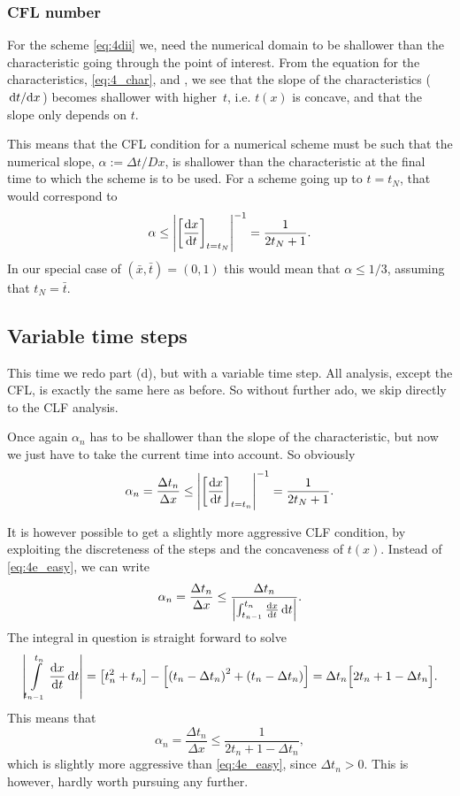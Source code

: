 \documentclass[11pt,letter, swedish, english
]{article}
\newcommand{\Dx}{\ensuremath{\Delta{x}}}
\newcommand{\Dt}{\ensuremath{\Delta{t}}}
\begin{document}
\subsubsection{CFL number}
For the scheme \eqref{eq:4dii} we, need the numerical domain to be
shallower than the characteristic going through the point of
interest. From the equation for the characteristics,
\eqref{eq:4_char}, and , we see that the slope of the
characteristics ($\dv*{t}{x}$) becomes shallower with higher~$t$, i.e.
$t(x)$ is concave, and that the slope only depends on $t$. 

This means that the CFL condition for a numerical scheme must be such
that the numerical slope, $\alpha := \Dt/Dx$, is shallower than the
characteristic at the final time to which the scheme is to be used. 
For a scheme going up to $t=t_N$, that would correspond to
\begin{equation}
\alpha \le \qty|\qty[\dv{x}{t}]_{t=t_N}|^{-1}
= \frac{1}{2t_N +1}.
\end{equation}
In our special case of $(\bar{x}, \bar{t}) = (0, 1)$ this would mean that 
$\alpha\le1/3$, assuming that $t_N=\bar{t}$.


\subsection{Variable time steps}
This time we redo part (d), but with a variable time step.
All analysis, except the CFL, is exactly the same here as before. So
without further ado, we skip directly to the CLF analysis. 

Once again $\alpha_n$ has to be shallower than the slope of the
characteristic, but now we just have to take the current time into
account. So obviously
\begin{equation}\label{eq:4e_easy}
\alpha_n = \frac{\Dt_n}{\Dx} \le \qty|\qty[\dv{x}{t}]_{t=t_n}|^{-1}
= \frac{1}{2t_N +1}.
\end{equation}

It is however possible to get a slightly more aggressive CLF condition,
by exploiting the discreteness of the steps and the concaveness of
$t(x)$. Instead of 
\eqref{eq:4e_easy}, we can write
\begin{equation}
\alpha_n = \frac{\Dt_n}{\Dx} 
\le \frac{\Dt_n}{\qty|\oldint_{t_{n-1}}^{t_{n}}\dv{x}{t}\id{t}|}.
\end{equation}
The integral in question is straight forward to solve
\begin{equation}
\qty|\int_{t_{n-1}}^{t_{n}}\dv{x}{t}\id{t}| 
= \qty[t_{n}^2 + t_{n}] -\qty[ \qty(t_{n}-\Dt_n)^2+(t_{n}-\Dt_n) ]
= \Dt_n\Big[2t_n + 1 - \Dt_n\Big].
\end{equation}
This means that 
\begin{equation}
\alpha_n = \frac{\Dt_n}{\Dx} 
\le \frac{1}{2t_n + 1 - \Dt_n},
\end{equation}
which is slightly more aggressive than \eqref{eq:4e_easy}, since
$\Dt_n>0$. This is however, hardly worth pursuing any further. 
\end{document}
